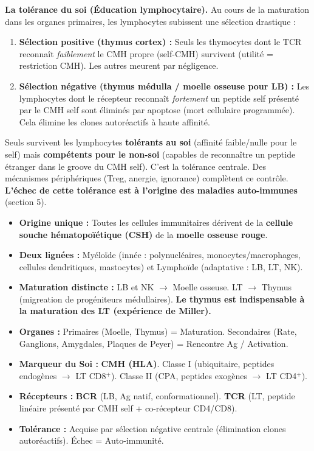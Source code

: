 \documentclass[11pt]{article}
\newcommand{\cle}[1]{{\popxbold\color{popdark}#1}}
\begin{document}
\textbf{La tolérance du soi (Éducation lymphocytaire).} Au cours de la maturation dans les organes primaires, les lymphocytes subissent une sélection drastique :
\begin{enumerate}
\item \textbf{Sélection positive (thymus cortex) :} Seuls les thymocytes dont le TCR reconnaît \emph{faiblement} le CMH propre (self-CMH) survivent (utilité = restriction CMH). Les autres meurent par négligence.
\item \textbf{Sélection négative (thymus médulla / moelle osseuse pour LB) :} Les lymphocytes dont le récepteur reconnaît \emph{fortement} un peptide self présenté par le CMH self sont éliminés par apoptose (mort cellulaire programmée). Cela élimine les clones autoréactifs à haute affinité.
\end{enumerate}
Seuls survivent les lymphocytes \textbf{tolérants au soi} (affinité faible/nulle pour le self) mais \textbf{compétents pour le non-soi} (capables de reconnaître un peptide étranger dans le groove du CMH self). C'est la \cle{tolérance centrale}. Des mécanismes périphériques (Treg, anergie, ignorance) complètent ce contrôle. \textbf{L'échec de cette tolérance est à l'origine des maladies auto-immunes} (section 5).

\begin{aretenir}
\begin{itemize}
\item \textbf{Origine unique :} Toutes les cellules immunitaires dérivent de la \textbf{cellule souche hématopoïétique (CSH)} de la \textbf{moelle osseuse rouge}.
\item \textbf{Deux lignées :} Myéloïde (innée : polynucléaires, monocytes/macrophages, cellules dendritiques, mastocytes) et Lymphoïde (adaptative : LB, LT, NK).
\item \textbf{Maturation distincte :} LB et NK $\rightarrow$ Moelle osseuse. LT $\rightarrow$ Thymus (migreation de progéniteurs médullaires). \textbf{Le thymus est indispensable à la maturation des LT (expérience de Miller).}
\item \textbf{Organes :} Primaires (Moelle, Thymus) = Maturation. Secondaires (Rate, Ganglions, Amygdales, Plaques de Peyer) = Rencontre Ag / Activation.
\item \textbf{Marqueur du Soi :} \textbf{CMH (HLA)}. Classe I (ubiquitaire, peptides endogènes $\rightarrow$ LT CD8$^+$). Classe II (CPA, peptides exogènes $\rightarrow$ LT CD4$^+$).
\item \textbf{Récepteurs :} \textbf{BCR} (LB, Ag natif, conformationnel). \textbf{TCR} (LT, peptide linéaire présenté par CMH self + co-récepteur CD4/CD8).
\item \textbf{Tolérance :} Acquise par sélection négative centrale (élimination clones autoréactifs). Échec = Auto-immunité.
\end{itemize}
\end{aretenir}
\end{document}
